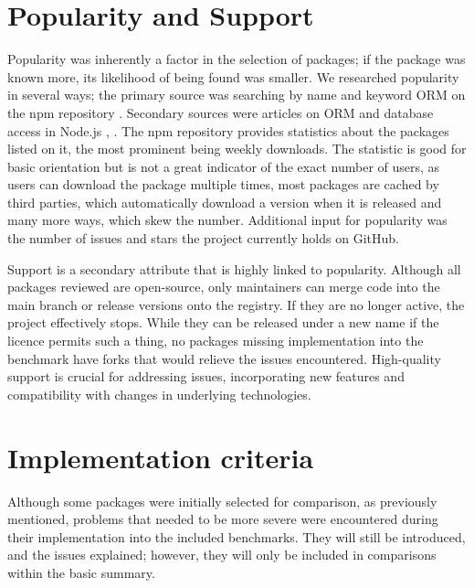 \section{Popularity and Support}
Popularity was inherently a factor in the selection of packages; if the package
was known more, its likelihood of being found was smaller. We researched
popularity in several ways; the primary source was searching by name and keyword
ORM on the npm repository \cite{npmSearchORM}. Secondary sources were articles on
ORM and database access in Node.js \cite{SitePoint_2021}, \cite{Wang_2020}. The npm
repository provides statistics about the packages listed on it, the most
prominent being weekly downloads. The statistic is good for basic orientation
but is not a great indicator of the exact number of users, as users can download
the package multiple times, most packages are cached by third parties, which
automatically download a version when it is released and many more ways, which
skew the number. Additional input for popularity was the number of issues and
stars the project currently holds on GitHub.

Support is a secondary attribute that is highly linked to popularity. Although
all packages reviewed are open-source, only maintainers can merge code into the
main branch or release versions onto the registry. If they are no longer active,
the project effectively stops. While they can be released under a new name if
the licence permits such a thing, no packages missing implementation into the
benchmark have forks that would relieve the issues encountered. High-quality
support is crucial for addressing issues, incorporating new features and
compatibility with changes in underlying technologies.

\section{Implementation criteria}
Although some packages were initially selected for comparison, as previously
mentioned, problems that needed to be more severe were encountered during their
implementation into the included benchmarks. They will still be introduced, and
the issues explained; however, they will only be included in comparisons within
the basic summary.

